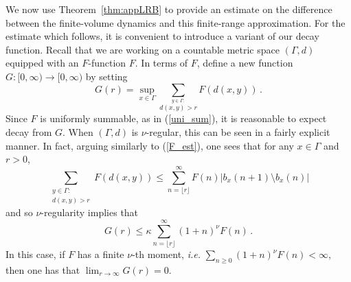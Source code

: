 \documentclass{article}
\newcommand{\<}{\langle}
\renewcommand{\>}{\rangle}
\numberwithin{equation}{section}
\theoremstyle{definition}
\begin{document}
%
%

We now use Theorem~\ref{thm:appLRB} to provide an estimate on the difference between the finite-volume dynamics and this finite-range approximation.  
For the estimate which follows, it is convenient to introduce a variant of our decay function. 
Recall that we are working on a countable metric space $(\Gamma, d)$ equipped with an $F$-function $F$. 
In terms of $F$, define a new function $G:[0, \infty) \to [0, \infty)$ by setting
\begin{equation} \label{def_G}
G(r) = \sup_{x \in \Gamma} \sum_{\stackrel{y \in \Gamma:}{d(x,y)>r}} F(d(x,y)) \, .
\end{equation}
Since $F$ is uniformly summable, as in (\ref{uni_sum}), it is reasonable to expect decay from $G$. 
When $(\Gamma, d)$ is $\nu$-regular, this can be seen in a fairly explicit manner. In fact, 
arguing similarly to (\ref{F_est}), one sees that for any $x \in \Gamma$ and $r>0$,
\begin{equation}
\sum_{\substack{y\in \Gamma:\\ d(x,y)> r}} F(d(x,y)) \leq \sum_{n= \lfloor r \rfloor}^\infty F(n) |b_x(n+1)\setminus b_x(n)|
\end{equation}
and so $\nu$-regularity implies that 
\begin{equation} \label{g_bd}
G(r) \leq \kappa \sum_{n = \lfloor r \rfloor}^{\infty} (1+n)^{\nu}F(n) \,.
\end{equation}
In this case, if $F$ has a finite $\nu$-th moment, \textit{i.e.} $\sum_{n \geq 0} (1+n)^{\nu}F(n) < \infty$, then one has that $\lim_{r \to \infty} G(r) =0$. 

%
%
\end{document}
